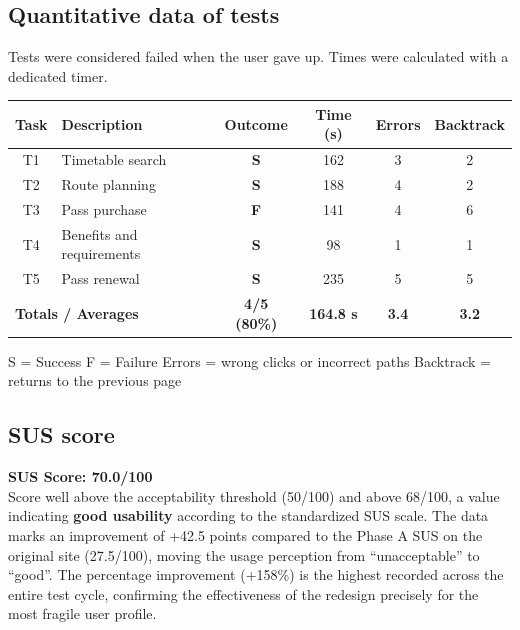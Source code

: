 ﻿\documentclass[11pt,a4paper]{article}
\begin{document}
\subsection*{Quantitative data of tests}
\begin{tcolorbox}[base]
Tests were considered failed when the user gave up.
Times were calculated with a dedicated timer.
\begin{center}
\renewcommand{\arraystretch}{1.4}
\begin{tabular}{clcccc}
\toprule
\textbf{Task} & \textbf{Description} &
\textbf{Outcome} & \textbf{Time (s)} &
\textbf{Errors} & \textbf{Backtrack} \\
\midrule
T1 & Timetable search           & \textbf{S} & 162 & 3 & 2 \\
T2 & Route planning              & \textbf{S} & 188 & 4 & 2 \\
T3 & Pass purchase                & \textbf{F} & 141 & 4 & 6 \\
T4 & Benefits and requirements   & \textbf{S} & 98  & 1 & 1 \\
T5 & Pass renewal                 & \textbf{S} & 235 & 5 & 5 \\
\midrule
\multicolumn{2}{l}{\textbf{Totals / Averages}} &
\textbf{4/5 (80\%)} & \textbf{164.8 s} &
\textbf{3.4} & \textbf{3.2} \\
\bottomrule
\end{tabular}
\end{center}

\vspace{0.3cm}
\small S = Success \quad F = Failure \quad
Errors = wrong clicks or incorrect paths \quad
Backtrack = returns to the previous page
\end{tcolorbox}

\subsection*{SUS score}
\begin{tcolorbox}[base]
\textbf{SUS Score: 70.0/100}\\[0.2cm]
\small Score well above the acceptability threshold
(50/100) and above 68/100, a value indicating \textbf{good
usability} according to the standardized SUS scale. The data marks
an improvement of +42.5 points compared to the Phase A SUS on the original
site (27.5/100), moving the usage perception from
``unacceptable'' to ``good''. The percentage improvement
(+158\%) is the highest recorded across the entire test cycle,
confirming the effectiveness of the redesign precisely for the most
fragile user profile.
\end{tcolorbox}
\end{document}
